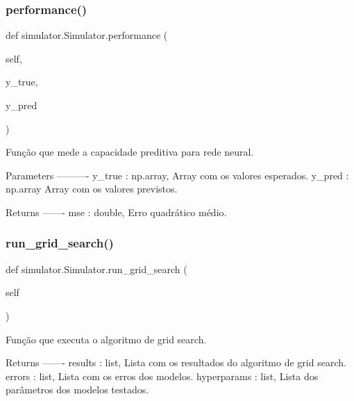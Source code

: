 \subsubsection{\texorpdfstring{performance()}{performance()}}
{\footnotesize\ttfamily def simulator.\+Simulator.\+performance (\begin{DoxyParamCaption}\item[{}]{self,  }\item[{}]{y\+\_\+true,  }\item[{}]{y\+\_\+pred }\end{DoxyParamCaption})}

\begin{DoxyVerb}Função que mede a capacidade preditiva para rede neural.

Parameters
----------
y_true : np.array,
    Array com os valores esperados.
y_pred : np.array
    Array com os valores previstos.

Returns
-------
mse : double,
    Erro quadrático médio.\end{DoxyVerb}
 \mbox{\label{classsimulator_1_1Simulator_ab35b39d33345b7da4bc856a1b9d81a0a}} 
\subsubsection{\texorpdfstring{run\+\_\+grid\+\_\+search()}{run\_grid\_search()}}
{\footnotesize\ttfamily def simulator.\+Simulator.\+run\+\_\+grid\+\_\+search (\begin{DoxyParamCaption}\item[{}]{self }\end{DoxyParamCaption})}

\begin{DoxyVerb}Função que executa o algoritmo de grid search.

Returns
-------
results : list,
    Lista com os resultados do algoritmo de grid search.
errors : list,
    Lista com os erros dos modelos.
hyperparams : list,
    Lista dos parâmetros dos modelos testados.\end{DoxyVerb}
 \mbox{\label{classsimulator_1_1Simulator_ae52bd7608ecf01ac5e426e8491d9ec44}} 
